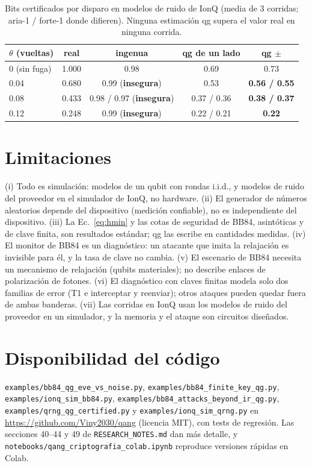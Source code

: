 \documentclass[11pt]{article}
\begin{document}
\begin{table}[t]
\centering\small
\caption{Bits certificados por disparo en modelos de ruido de IonQ (media de 3 corridas; aria-1 / forte-1
donde difieren). Ninguna estimación qg supera el valor real en ninguna corrida.}
\label{tab:qrngionq}
\begin{tabular}{lcccc}
\toprule
$\theta$ (vueltas) & real & ingenua & qg de un lado & qg $\pm$\\
\midrule
0 (sin fuga) & 1.000 & 0.98 & 0.69 & 0.73\\
0.04 & 0.680 & 0.99 (\textbf{insegura}) & 0.53 & \textbf{0.56 / 0.55}\\
0.08 & 0.433 & 0.98 / 0.97 (\textbf{insegura}) & 0.37 / 0.36 & \textbf{0.38 / 0.37}\\
0.12 & 0.248 & 0.99 (\textbf{insegura}) & 0.22 / 0.21 & \textbf{0.22}\\
\bottomrule
\end{tabular}
\end{table}

\section{Limitaciones}

(i) Todo es simulación: modelos de un qubit con rondas i.i.d., y modelos de ruido del proveedor en el
simulador de IonQ, no hardware. (ii) El generador de números aleatorios depende del dispositivo (medición
confiable), no es independiente del dispositivo. (iii) La Ec.~\eqref{eq:hmin} y las cotas de seguridad de
BB84, asintóticas y de clave finita, son resultados estándar; qg las escribe en cantidades medidas.
(iv) El monitor de BB84 es un diagnóstico: un atacante que imita la relajación es invisible para él, y la
tasa de clave no cambia. (v) El escenario de BB84 necesita un mecanismo de relajación (qubits materiales);
no describe enlaces de polarización de fotones. (vi) El diagnóstico con claves finitas modela solo dos
familias de error (T1 e interceptar y reenviar); otros ataques pueden quedar fuera de ambas banderas.
(vii) Las corridas en IonQ usan los modelos de ruido del proveedor en un simulador, y la memoria y el ataque
son circuitos diseñados.

\section{Disponibilidad del código}
\sloppy
\texttt{examples/bb84\_qg\_eve\_vs\_noise.py}, \texttt{examples/bb84\_finite\_key\_qg.py},
\texttt{examples/ionq\_sim\_bb84.py}, \texttt{examples/bb84\_attacks\_beyond\_ir\_qg.py},
\texttt{examples/qrng\_qg\_certified.py} y \texttt{examples/ionq\_sim\_qrng.py} en
\url{https://github.com/Viny2030/qang} (licencia MIT), con tests de regresión. Las secciones 40--44 y 49 de
\texttt{RESEARCH\_NOTES.md} dan más detalle, y \texttt{notebooks/qang\_criptografia\_colab.ipynb} reproduce
versiones rápidas en Colab.



\end{document}
